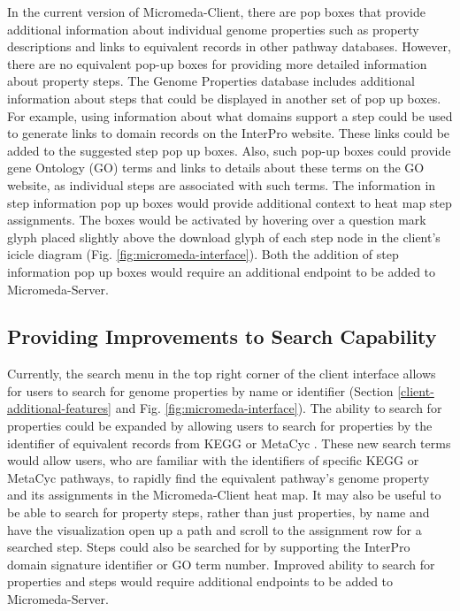 In the current version of Micromeda-Client, there are pop boxes that provide additional information about individual genome properties such as property descriptions and links to equivalent records in other pathway databases. However, there are no equivalent pop-up boxes for providing more detailed information about property steps. The Genome Properties database includes additional information about steps that could be displayed in another set of pop up boxes. For example, using information about what domains support a step could be used to generate links to domain records on the InterPro website. These links could be added to the suggested step pop up boxes. Also, such pop-up boxes could provide gene Ontology (GO) terms and links to details about these terms on the GO website, as individual steps are associated with such terms. The information in step information pop up boxes would provide additional context to heat map step assignments. The boxes would be activated by hovering over a question mark glyph placed slightly above the download glyph of each step node in the client's icicle diagram (Fig. \ref{fig:micromeda-interface}). Both the addition of step information pop up boxes would require an additional endpoint to be added to Micromeda-Server.

\subsection{Providing Improvements to Search Capability}

Currently, the search menu in the top right corner of the client interface allows for users to search for genome properties by name or identifier (Section \ref{client-additional-features} and Fig. \ref{fig:micromeda-interface}). The ability to search for properties could be expanded by allowing users to search for properties by the identifier of equivalent records from KEGG \cite{kanehisa2000kegg} or MetaCyc \cite{karp2002metacyc}. These new search terms would allow users, who are familiar with the identifiers of specific KEGG or MetaCyc pathways, to rapidly find the equivalent pathway's genome property and its assignments in the Micromeda-Client heat map. It may also be useful to be able to search for property steps, rather than just properties, by name and have the visualization open up a path and scroll to the assignment row for a searched step. Steps could also be searched for by supporting the InterPro domain signature identifier or GO term number. Improved ability to search for properties and steps would require additional endpoints to be added to Micromeda-Server.

